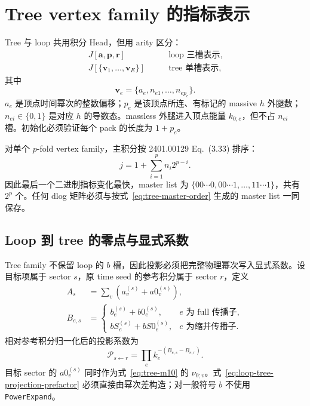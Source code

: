 ﻿\documentclass[a4paper,11pt]{article}
\begin{document}
\section{Tree vertex family 的指标表示}

Tree 与 loop 共用积分 Head，但用 arity 区分：
\begin{align}
 J[\bm a,\bm p,\bm r]&\qquad\text{loop 三槽表示},\\
 J[\{\bm v_1,\ldots,\bm v_E\}]&\qquad\text{tree 单槽表示},
\end{align}
其中
\begin{equation}
 \bm v_e=\{a_e,n_{e1},\ldots,n_{e p_e}\}.
 \label{eq:tree-vertex-pack}
\end{equation}
$a_e$ 是顶点时间幂次的整数偏移；$p_e$ 是该顶点所连、有标记的 massive $h$ 外腿数；$n_{ei}\in\{0,1\}$ 是对应 $h$ 的导数态。massless 外腿进入顶点能量 $k_{0;e}$，但不占 $n_{ei}$ 槽。初始化必须验证每个 pack 的长度为 $1+p_e$。

对单个 $p$-fold vertex family，主积分按 2401.00129 Eq.~(3.33) 排序：
\begin{equation}
 j=1+\sum_{i=1}^{p}n_i2^{p-i}.
 \label{eq:tree-master-order}
\end{equation}
因此最后一个二进制指标变化最快，master list 为 $\{00\cdots0,00\cdots1,\ldots,11\cdots1\}$，共有 $2^p$ 个。任何 dlog 矩阵必须与按式~\eqref{eq:tree-master-order} 生成的 master list 一同保存。

\subsection{Loop 到 tree 的零点与显式系数}

Tree family 不保留 loop 的 $b$ 槽，因此投影必须把完整物理幂次写入显式系数。设目标项属于 sector $s$，原 time seed 的参考积分属于 sector $r$，定义
\begin{align}
 A_s&=\sum_v\left(a_v^{(s)}+a0_v^{(s)}\right),\\
 B_{e,s}&=\begin{cases}
 b_e^{(s)}+b0_e^{(s)},&e\text{ 为 full 传播子},\\
 bS_e^{(s)}+bS0_e^{(s)},&e\text{ 为缩并传播子}.
 \end{cases}
\end{align}
相对参考积分归一化后的投影系数为
\begin{equation}
 \mathcal P_{s\leftarrow r}
 =\prod_e k_e^{-\left(B_{e,s}-B_{e,r}\right)}.
 \label{eq:loop-tree-projection-prefactor}
\end{equation}
目标 sector 的 $a0_v^{(s)}$ 同时作为式~\eqref{eq:tree-m10} 的 $\nu_{0;v}$。式~\eqref{eq:loop-tree-projection-prefactor} 必须直接由幂次差构造；对一般符号 $b$ 不使用 \texttt{PowerExpand}。
\end{document}
